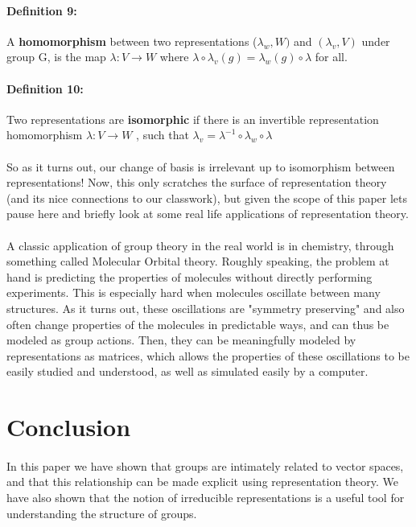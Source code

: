 \documentclass[twoside]{article}
\begin{document}
\begin{spacing}{1.25}
\paragraph{Definition 9:} A \textbf{homomorphism} between two representations ($\lambda_w, W)$ and $(\lambda_v, V)$ under group G, is the map
 $\lambda:V \rightarrow W$ where 
$\lambda\circ\lambda_v(g) = \lambda_w(g)\circ\lambda$ for all.
\paragraph{Definition 10:} Two representations are \textbf{isomorphic} if there is an invertible representation homomorphism $\lambda:V \rightarrow W$
, such that $\lambda_v = \lambda^{-1}\circ\lambda_w\circ\lambda$

\paragraph{}So as it turns out, our change of basis is irrelevant up to isomorphism between representations! Now, this only scratches 
the surface of representation theory (and its nice connections to our classwork), but given the scope of this paper lets pause here and briefly look at some 
real life applications of representation theory.

\paragraph{} A classic application of group theory in the real world is in chemistry, through something called
Molecular Orbital theory. Roughly speaking, the problem at hand is predicting the properties of molecules
without directly performing experiments. This is especially hard when molecules oscillate between many structures. As it turns out, these oscillations are "symmetry preserving" and also often change properties of the molecules in
predictable ways, and can thus be modeled as group actions.
Then, they can be meaningfully modeled by representations 
as matrices, which allows the properties of these oscillations to be easily studied and understood, as well
as simulated easily by a computer. 

\section{Conclusion}

\paragraph*{}  In this paper we have shown that groups are intimately related to
vector spaces, and that this relationship can be made explicit using representation
theory. We have also shown that the notion of irreducible representations is a
useful tool for understanding the structure of groups. 


\end{spacing}
\end{document}
